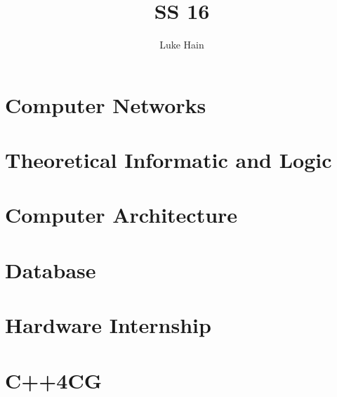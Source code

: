 \documentclass[a4paper, 12pt] {report} %
\author{Luke Hain}
\begin{document}
\title{SS 16}
\maketitle

\tableofcontents{}


\part{Computer Networks}



\part{Theoretical Informatic and Logic}



\part{Computer Architecture}



\part{Database}




\part{Hardware Internship}
%

\part{C++4CG}
%
\end{document}
